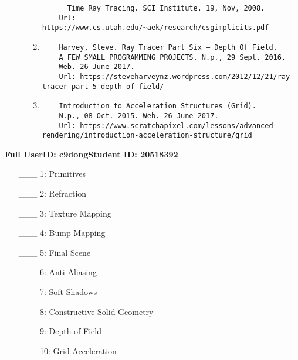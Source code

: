 \documentclass {article}
\begin{document}
\begin{description}
\begin{enumerate}
\begin{verbatim}
      Time Ray Tracing. SCI Institute. 19, Nov, 2008.
    Url: https://www.cs.utah.edu/~aek/research/csgimplicits.pdf
    \end{verbatim}
    \item
    \begin{verbatim}
    Harvey, Steve. Ray Tracer Part Six – Depth Of Field. 
    A FEW SMALL PROGRAMMING PROJECTS. N.p., 29 Sept. 2016. 
    Web. 26 June 2017.
    Url: https://steveharveynz.wordpress.com/2012/12/21/ray-tracer-part-5-depth-of-field/
    \end{verbatim}
    \item
    \begin{verbatim}
    Introduction to Acceleration Structures (Grid). 
    N.p., 08 Oct. 2015. Web. 26 June 2017.
    Url: https://www.scratchapixel.com/lessons/advanced-rendering/introduction-acceleration-structure/grid
    \end{verbatim}
    \end{enumerate}

\end{description}
\newpage



{\hfill{\bf Full UserID: c9dong}\hfill{\bf Student ID: 20518392}\hfill}

\begin{enumerate}
     \item[\_\_\_ 1:]  Primitives

     \item[\_\_\_ 2:]  Refraction

     \item[\_\_\_ 3:]  Texture Mapping

     \item[\_\_\_ 4:]  Bump Mapping

     \item[\_\_\_ 5:]  Final Scene

     \item[\_\_\_ 6:]  Anti Aliasing

     \item[\_\_\_ 7:]  Soft Shadows

     \item[\_\_\_ 8:]  Constructive Solid Geometry

     \item[\_\_\_ 9:]  Depth of Field

     \item[\_\_\_ 10:]  Grid Acceleration
\end{enumerate}

\end{document}

